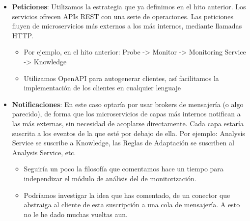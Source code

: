 \begin{itemize}
  \item \textbf{Peticiones}: Utilizamos la estrategia que ya definimos en el hito anterior. Los servicios ofrecen APIs REST con una serie de operaciones. Las peticiones fluyen de microservicios más externos a los más internos, mediante llamadas HTTP.

  \begin{itemize}
    \item Por ejemplo, en el hito anterior: Probe -> Monitor -> Monitoring Service -> Knowledge

    \item Utilizamos OpenAPI para autogenerar clientes, así facilitamos la implementación de los clientes en cualquier lenguaje
  \end{itemize}

  \item \textbf{Notificaciones}: En este caso optaría por usar brokers de mensajería (o algo parecido), de forma que los microservicios de capas más internos notifican a las más externas, sin necesidad de acoplarse directamente. Cada capa estaría suscrita a los eventos de la que esté por debajo de ella. Por ejemplo: Analysis Service se suscribe a Knowledge, las Reglas de Adaptación se suscriben al Analysis Service, etc.

  \begin{itemize}
    \item Seguiría un poco la filosofía que comentamos hace un tiempo para independizar el módulo de análisis del de monitorización.

    \item Podríamos investigar la idea que has comentado, de un conector que abstraiga al cliente de esta suscripción a una cola de mensajería. A esto no le he dado muchas vueltas aun.
  \end{itemize}

\end{itemize}


